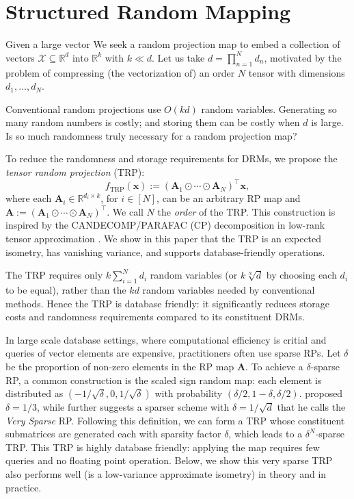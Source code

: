 \section{Structured Random Mapping}
Given a large vector
We seek a random projection map to embed a collection of vectors
$\mathcal X \subseteq \mathbb{R}^{d}$
into $\mathbb{R}^k$ with $k \ll d$.
Let us take $d = \prod_{n=1}^N d_n$, motivated by the problem of compressing
(the vectorization of) an order $N$ tensor with dimensions $d_1,\ldots,d_N$.

Conventional random projections use $O(kd)$ random variables.
Generating so many random numbers is costly; and storing them can be costly when $d$ is large.
Is so much randomness truly necessary for a random projection map?

To reduce the randomness and storage requirements for DRMs, we propose
the \emph{tensor random projection} (TRP):
\begin{equation}
\label{eq:TRP}
f_{\text{TRP}}(\mathbf{x}):= (\mathbf{A}_1 \odot \cdots \odot \mathbf{A}_N)^\top
\mathbf{x},
\end{equation}
where each $\mathbf{A}_i \in \mathbb{R}^{d_i \times k}$, for $i \in [N]$,
can be an arbitrary RP map and
$\mathbf{A} := (\mathbf{A}_1 \odot \cdots \odot \mathbf{A}_N)^\top$.
We call $N$ the \emph{order} of the TRP.
This construction is inspired by the CANDECOMP/PARAFAC (CP) decomposition in
low-rank tensor approximation \cite{kolda2009tensor}.
We show in this paper that the TRP is an expected isometry,
has vanishing variance,
and supports database-friendly operations.

The TRP requires only $k\sum_{i = 1}^N d_i$ random variables
(or $k\sqrt[N]{d}$ by choosing each $d_i$ to be equal),
rather than the $kd$ random variables needed by conventional methods.
Hence the TRP is database friendly:
it significantly reduces storage costs and randomness requirements compared to its
constituent DRMs.

In large scale database settings,
where computational efficiency is critial and queries of vector elements are expensive,
practitioners often use sparse RPs.
Let $\delta$ be the proportion of non-zero elements in the RP map $\mathbf{A}$.
To achieve a $\delta$-sparse RP, a common construction is the scaled sign random map:
each element is distributed as $(-1/\sqrt{\delta}, 0, 1/\sqrt{\delta})$ with probability
$(\delta/2, 1-\delta, \delta/2)$.
\cite{achlioptas2003database} proposed $\delta=1/3$,
while \cite{li2006very} further suggests a sparser scheme with
$\delta=1/\sqrt{d}$ that he calls the \textit{Very Sparse} RP.
Following this definition, we can form a TRP whose constituent submatrices
are generated each with sparsity factor $\delta$, which leads to a $\delta^N$-sparse TRP.
This TRP is highly database friendly: applying the map requires few queries and no floating point operation.
Below, we show this very sparse TRP also performs well (is a low-variance approximate isometry)
in theory and in practice.

